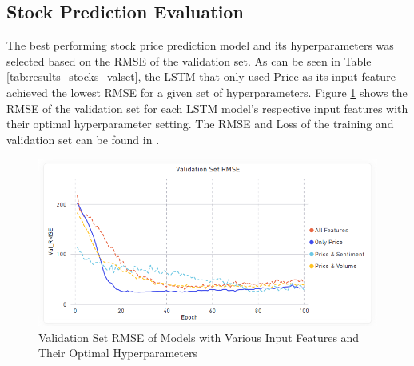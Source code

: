 \documentclass[11pt, a4paper]{article}
\begin{document}
\subsection{Stock Prediction Evaluation}
The best performing stock price prediction model and its hyperparameters was selected based on the RMSE of the validation set. As can be seen
in Table \ref{tab:results_stocks_valset}, the LSTM that only used Price as its input feature achieved the lowest RMSE for a given set of hyperparameters.
Figure \ref{fig:lstm_models_rmse_validation_set} shows the RMSE of the validation set for each LSTM model's respective input features with their optimal hyperparameter setting.
The RMSE and Loss of the training and validation set can be found in .

\begin{table}[!h]
    \caption{Validation Set RMSE for ARIMA and LSTM Time-Series Models}
    \label{tab:results_stocks_valset}
    \centering
    \small
\end{table}

\begin{figure}[!h]
    \centering
    \includegraphics[scale = 0.45]{Best_Params_Of_Model_RMSE_Validation_Set.png}
    \caption{Validation Set RMSE of Models with Various Input Features and Their Optimal Hyperparameters}
    \label{fig:lstm_models_rmse_validation_set}
\end{figure}
\end{document}
